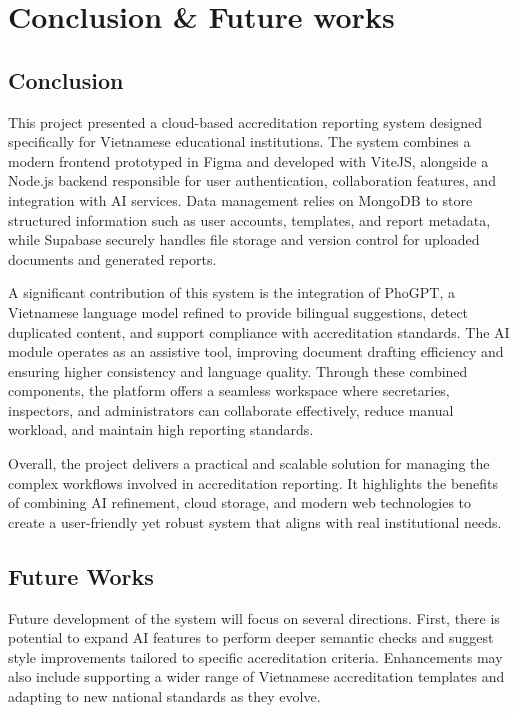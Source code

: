 \chapter{Conclusion \& Future works}

\section{Conclusion}

This project presented a cloud-based accreditation reporting system designed specifically for Vietnamese educational institutions. The system combines a modern frontend prototyped in Figma and developed with ViteJS, alongside a Node.js backend responsible for user authentication, collaboration features, and integration with AI services. Data management relies on MongoDB to store structured information such as user accounts, templates, and report metadata, while Supabase securely handles file storage and version control for uploaded documents and generated reports.

A significant contribution of this system is the integration of PhoGPT, a Vietnamese language model refined to provide bilingual suggestions, detect duplicated content, and support compliance with accreditation standards. The AI module operates as an assistive tool, improving document drafting efficiency and ensuring higher consistency and language quality. Through these combined components, the platform offers a seamless workspace where secretaries, inspectors, and administrators can collaborate effectively, reduce manual workload, and maintain high reporting standards.

Overall, the project delivers a practical and scalable solution for managing the complex workflows involved in accreditation reporting. It highlights the benefits of combining AI refinement, cloud storage, and modern web technologies to create a user-friendly yet robust system that aligns with real institutional needs.

\section{Future Works}

Future development of the system will focus on several directions. First, there is potential to expand AI features to perform deeper semantic checks and suggest style improvements tailored to specific accreditation criteria. Enhancements may also include supporting a wider range of Vietnamese accreditation templates and adapting to new national standards as they evolve.

